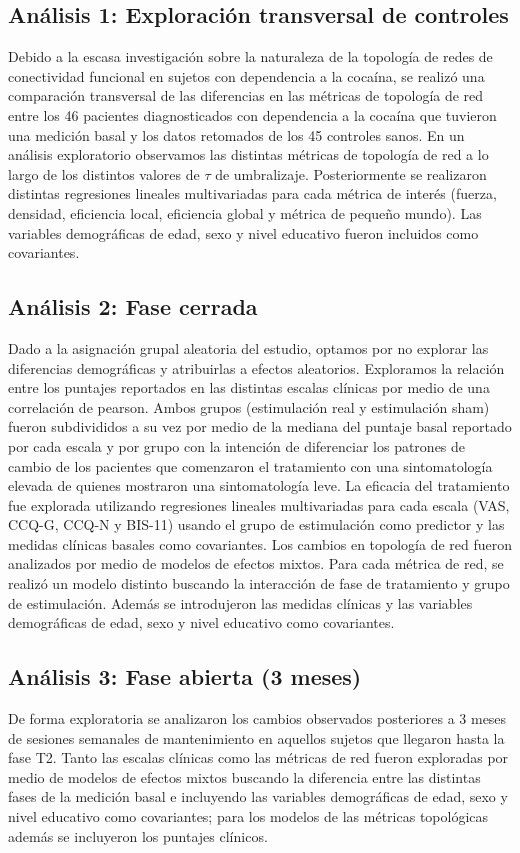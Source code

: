 \subsection{Análisis 1: Exploración transversal de controles}
Debido a la escasa investigación sobre la naturaleza de la topología de redes de conectividad funcional en sujetos con dependencia a la cocaína, se realizó una comparación transversal de las diferencias en las métricas de topología de red entre los 46 pacientes diagnosticados con dependencia a la cocaína que tuvieron una medición basal y los datos retomados de los 45 controles sanos.
En un análisis exploratorio observamos las distintas métricas de topología de red a lo largo de los distintos valores de $\tau$ de umbralizaje. Posteriormente se realizaron distintas regresiones lineales multivariadas para cada métrica de interés (fuerza, densidad, eficiencia local, eficiencia global y métrica de pequeño mundo). Las variables demográficas de edad, sexo y nivel educativo fueron incluidos como covariantes.

\subsection{Análisis 2: Fase cerrada}
Dado a la asignación grupal aleatoria del estudio, optamos por no explorar las diferencias demográficas y atribuirlas a efectos aleatorios.
Exploramos la relación entre los puntajes reportados en las distintas escalas clínicas por medio de una correlación de pearson.
Ambos grupos (estimulación real y estimulación sham) fueron subdivididos a su vez por medio de la mediana del puntaje basal reportado por cada escala y por grupo con la intención de diferenciar los patrones de cambio de los pacientes que comenzaron el tratamiento con una sintomatología elevada de quienes mostraron una sintomatología leve.
La eficacia del tratamiento fue explorada utilizando regresiones lineales multivariadas para cada escala (VAS, CCQ-G, CCQ-N y BIS-11) usando el grupo de estimulación como predictor y las medidas clínicas basales como covariantes.
Los cambios en topología de red fueron analizados por medio de modelos de efectos mixtos. Para cada métrica de red, se realizó un modelo distinto buscando la interacción de fase de tratamiento y grupo de estimulación. Además se introdujeron las medidas clínicas y las variables demográficas de edad, sexo y nivel educativo como covariantes.

\subsection{Análisis 3: Fase abierta (3 meses)}
De forma exploratoria se analizaron los cambios observados posteriores a 3 meses de sesiones semanales de mantenimiento en aquellos sujetos que llegaron hasta la fase T2.
Tanto las escalas clínicas como las métricas de red fueron exploradas por medio de modelos de efectos mixtos buscando la diferencia entre las distintas fases de la medición basal e incluyendo las variables demográficas de edad, sexo y nivel educativo como covariantes; para los modelos de las métricas topológicas además se incluyeron los puntajes clínicos.

